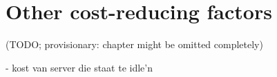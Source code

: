 \chapter{Other cost-reducing factors}
(TODO; provisionary: chapter might be omitted completely)

- kost van server die staat te idle'n